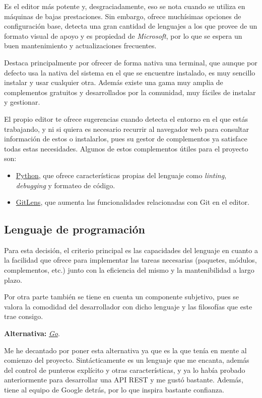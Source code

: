 Es el editor más potente y, desgraciadamente, eso se nota cuando se utiliza en máquinas de bajas prestaciones. Sin embargo, ofrece muchísimas opciones de configuración base, detecta una gran cantidad de lenguajes a los que provee de un formato visual de apoyo y es propiedad de \textit{Microsoft}, por lo que se espera un buen mantenimiento y actualizaciones frecuentes.

Destaca principalmente por ofrecer de forma nativa una terminal, que aunque por defecto usa la nativa del sistema en el que se encuentre instalado, es muy sencillo instalar y usar cualquier otra. Además existe una gama muy amplia de complementos gratuitos y desarrollados por la comunidad, muy fáciles de instalar y gestionar. 

El propio editor te ofrece sugerencias cuando detecta el entorno en el que estás trabajando, y ni si quiera es necesario recurrir al navegador web para consultar información de estos o instalarlos, pues su gestor de complementos ya satisface todas estas necesidades. Algunos de estos complementos útiles para el proyecto son:
\begin{itemize}
    \item \href{https://marketplace.visualstudio.com/items?itemName=ms-python.python}{Python}, que ofrece características propias del lenguaje como \textit{linting}, \textit{debugging} y formateo de código.
    \item \href{https://marketplace.visualstudio.com/items?itemName=eamodio.gitlens}{GitLens}, que aumenta las funcionalidades relacionadas con Git en el editor.
\end{itemize}

\subsection{Lenguaje de programación}

Para esta decisión, el criterio principal es las capacidades del lenguaje en cuanto a la facilidad que ofrece para implementar las tareas necesarias (paquetes, módulos, complementos, etc.) junto con la eficiencia del mismo y la mantenibilidad a largo plazo.

Por otra parte también se tiene en cuenta un componente subjetivo, pues se valora la comodidad del desarrollador con dicho lenguaje y las filosofías que este trae consigo.

\textbf{Alternativa:} \href{https://go.dev/}{\textit{Go}}.

Me he decantado por poner esta alternativa ya que es la que tenía en mente al comienzo del proyecto. Sintácticamente es un lenguaje que me encanta, además del control de punteros explícito y otras características, y ya lo había probado anteriormente para desarrollar una API REST y me gustó bastante. Además, tiene al equipo de Google detrás, por lo que inspira bastante confianza.

